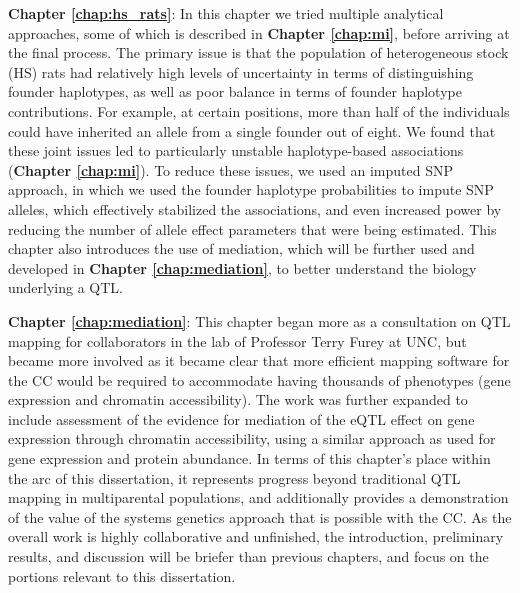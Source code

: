 \textbf{Chapter \ref{chap:hs_rats}}: In this chapter we tried multiple analytical approaches, some of which is described in \textbf{Chapter \ref{chap:mi}}, before arriving at the final process. The primary issue is that the population of heterogeneous stock (HS) rats had relatively high levels of uncertainty in terms of distinguishing founder haplotypes, as well as poor balance in terms of founder haplotype contributions. For example, at certain positions, more than half of the individuals could have inherited an allele from a single founder out of eight. We found that these joint issues led to particularly unstable haplotype-based associations (\textbf{Chapter \ref{chap:mi}}). To reduce these issues, we used an imputed SNP approach, in which we used the founder haplotype probabilities to impute SNP alleles, which effectively stabilized the associations, and even increased power by reducing the number of allele effect parameters that were being estimated. This chapter also introduces the use of mediation, which will be further used and developed in \textbf{Chapter \ref{chap:mediation}}, to better understand the biology underlying a QTL.

\textbf{Chapter \ref{chap:mediation}}: This chapter began more as a consultation on QTL mapping for collaborators in the lab of Professor Terry Furey at UNC, but became more involved as it became clear that more efficient mapping software for the CC would be required to accommodate having thousands of phenotypes (gene expression and chromatin accessibility). The work was further expanded to include assessment of the evidence for mediation of the eQTL effect on gene expression through chromatin accessibility, using a similar approach as \cite{Chick2016} used for gene expression and protein abundance. In terms of this chapter's place within the arc of this dissertation, it represents progress beyond traditional QTL mapping in multiparental populations, and additionally provides a demonstration of the value of the systems genetics approach that is possible with the CC. As the overall work is highly collaborative and unfinished, the introduction, preliminary results, and discussion will be briefer than previous chapters, and focus on the portions relevant to this dissertation.


\clearpage
